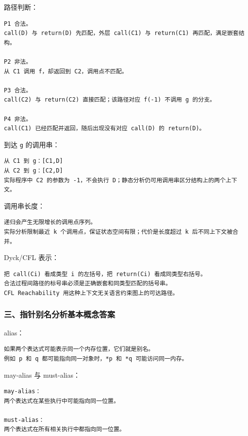 \documentclass[UTF8]{ctexart}
\begin{document}
路径判断：

\begin{Verbatim}[fontsize=\small,breaklines=true]
P1 合法。
call(D) 与 return(D) 先匹配，外层 call(C1) 与 return(C1) 再匹配，满足嵌套结构。

P2 非法。
从 C1 调用 f，却返回到 C2，调用点不匹配。

P3 合法。
call(C2) 与 return(C2) 直接匹配；该路径对应 f(-1) 不调用 g 的分支。

P4 非法。
call(C1) 已经匹配并返回，随后出现没有对应 call(D) 的 return(D)。
\end{Verbatim}

到达 \texttt{g} 的调用串：

\begin{Verbatim}[fontsize=\small,breaklines=true]
从 C1 到 g：[C1,D]
从 C2 到 g：[C2,D]
实际程序中 C2 的参数为 -1，不会执行 D；静态分析仍可用调用串区分结构上的两个上下文。
\end{Verbatim}

调用串长度：

\begin{Verbatim}[fontsize=\small,breaklines=true]
递归会产生无限增长的调用点序列。
实际分析限制最近 k 个调用点，保证状态空间有限；代价是长度超过 k 后不同上下文被合并。
\end{Verbatim}

Dyck/CFL 表示：

\begin{Verbatim}[fontsize=\small,breaklines=true]
把 call(Ci) 看成类型 i 的左括号，把 return(Ci) 看成同类型右括号。
合法过程间路径的标号串必须是正确嵌套和同类型匹配的括号串。
CFL Reachability 用这种上下文无关语言约束图上的可达路径。
\end{Verbatim}

\subsubsection*{三、指针别名分析基本概念答案}

alias：

\begin{Verbatim}[fontsize=\small,breaklines=true]
如果两个表达式可能表示同一个内存位置，它们就是别名。
例如 p 和 q 都可能指向同一对象时，*p 和 *q 可能访问同一内存。
\end{Verbatim}

may-alias 与 must-alias：

\begin{Verbatim}[fontsize=\small,breaklines=true]
may-alias：
两个表达式在某些执行中可能指向同一位置。

must-alias：
两个表达式在所有相关执行中都指向同一位置。
\end{Verbatim}
\end{document}
